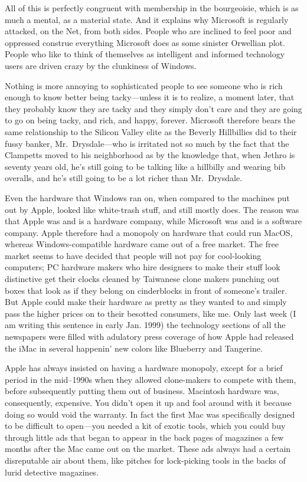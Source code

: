 \documentclass[
  fontsize=11pt,
  paper=landscape,
  twocolumn=true,
  pagesize=pdftex,
  headings=small,
  DIV=15,
  ]{scrartcl}
\begin{document}
All of this is perfectly congruent with membership in the bourgeoisie,
which is as much a mental, as a material state. And it explains why
Microsoft is regularly attacked, on the Net, from both sides. People who
are inclined to feel poor and oppressed construe everything Microsoft
does as some sinister Orwellian plot. People who like to think of
themselves as intelligent and informed technology users are driven crazy
by the clunkiness of Windows.

Nothing is more annoying to sophisticated people to see someone who is
rich enough to know better being tacky---unless it is to realize, a
moment later, that they probably know they are tacky and they simply
don't care and they are going to go on being tacky, and rich, and happy,
forever. Microsoft therefore bears the same relationship to the Silicon
Valley elite as the Beverly Hillbillies did to their fussy banker,
Mr.~Drysdale---who is irritated not so much by the fact that the
Clampetts moved to his neighborhood as by the knowledge that, when
Jethro is seventy years old, he's still going to be talking like a
hillbilly and wearing bib overalls, and he's still going to be a lot
richer than Mr.~Drysdale.

Even the hardware that Windows ran on, when compared to the machines put
out by Apple, looked like white-trash stuff, and still mostly does. The
reason was that Apple was and is a hardware company, while Microsoft was
and is a software company. Apple therefore had a monopoly on hardware
that could run MacOS, whereas Windows-compatible hardware came out of a
free market. The free market seems to have decided that people will not
pay for cool-looking computers; PC hardware makers who hire designers to
make their stuff look distinctive get their clocks cleaned by Taiwanese
clone makers punching out boxes that look as if they belong on
cinderblocks in front of someone's trailer. But Apple could make their
hardware as pretty as they wanted to and simply pass the higher prices
on to their besotted consumers, like me. Only last week (I am writing
this sentence in early Jan. 1999) the technology sections of all the
newspapers were filled with adulatory press coverage of how Apple had
released the iMac in several happenin' new colors like Blueberry and
Tangerine.

Apple has always insisted on having a hardware monopoly, except for a
brief period in the mid--1990s when they allowed clone-makers to compete
with them, before subsequently putting them out of business. Macintosh
hardware was, consequently, expensive. You didn't open it up and fool
around with it because doing so would void the warranty. In fact the
first Mac was specifically designed to be difficult to open---you needed
a kit of exotic tools, which you could buy through little ads that began
to appear in the back pages of magazines a few months after the Mac came
out on the market. These ads always had a certain disreputable air about
them, like pitches for lock-picking tools in the backs of lurid
detective magazines.
\end{document}
